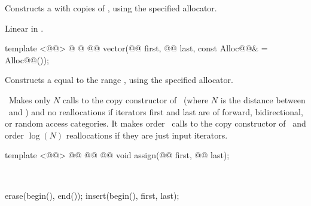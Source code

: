 \documentclass[american,twoside]{book}
\begin{document}
\begin{itemdescr}
\pnum
\effects Constructs a  with 
copies of , using the specified allocator.

\pnum
{}

\pnum
\complexity Linear in .
\end{itemdescr}

\begin{itemdecl}
template <@@>
  @ @ 
        @@
  vector(@@ first, @@ last,
         const Alloc@@& = Alloc@@());
\end{itemdecl}

\begin{itemdescr}

\pnum
\effects Constructs a  equal to the
range , using the specified allocator.

\pnum
\complexity\ 
Makes only $N$
calls to the copy constructor of
\
(where $N$
is the distance between
\
and
)
and no reallocations if iterators first and last are of forward, bidirectional, or random access categories.
It makes order
\tcode{N}\
calls to the copy constructor of
\tcode{T}\
and order
$\log(N)$
reallocations if they are just input iterators.
\end{itemdescr}

%
\begin{itemdecl}
template <@@>
  @@
        @@
        @\addedCC{\&\& MoveConstructible<T>}@
  void assign(@@ first, @@ last);
\end{itemdecl}

\begin{itemdescr}
\pnum
\effects\ 
\begin{codeblock}
erase(begin(), end());
insert(begin(), first, last);
\end{codeblock}
\end{itemdescr}
\end{document}
